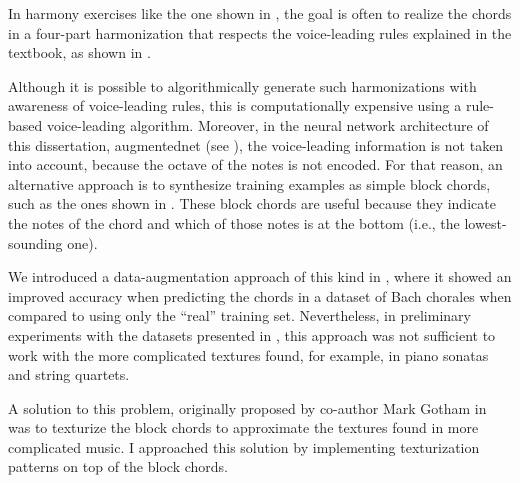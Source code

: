 
In harmony exercises like the one shown in
, the goal is often to
\gls{realize} the chords in a four-part harmonization that
respects the voice-leading rules explained in the textbook,
as shown in . 


Although it is possible to algorithmically generate such
harmonizations with awareness of voice-leading rules, this
is computationally expensive using a rule-based
voice-leading
algorithm.
Moreover, in the neural network architecture of this
dissertation, \gls{augmentednet} (see
), the voice-leading information is not
taken into account, because the octave of the notes is not
encoded. For that reason, an alternative approach is to
synthesize training examples as simple block chords, such as
the ones shown in . These block
chords are useful because they indicate the notes of the
chord and which of those notes is at the bottom (i.e., the
lowest-sounding one). 

We introduced a data-augmentation approach of this kind in
\textcite{napoleslopez2020harmonic}, where it showed an
improved accuracy when predicting the chords in a dataset of
Bach chorales when compared to using only the ``real''
training set. Nevertheless, in preliminary experiments with
the datasets presented in
, this approach was not
sufficient to work with the more complicated textures found,
for example, in piano sonatas and string quartets.


A solution to this problem, originally proposed by co-author
Mark Gotham in \textcite{napoleslopez2021augmentednet} was
to texturize the block chords to approximate the textures
found in more complicated music. I approached this solution
by implementing texturization patterns on top of the block
chords.
